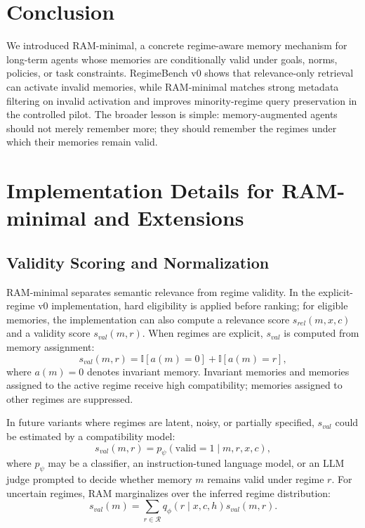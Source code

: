 \documentclass{article} %
\begin{document}
\section{Conclusion}
\label{sec:conclusion}

We introduced RAM-minimal, a concrete regime-aware memory mechanism for long-term agents whose memories are conditionally valid under goals, norms, policies, or task constraints.
RegimeBench v0 shows that relevance-only retrieval can activate invalid memories, while RAM-minimal matches strong metadata filtering on invalid activation and improves minority-regime query preservation in the controlled pilot.
The broader lesson is simple: memory-augmented agents should not merely remember more; they should remember the regimes under which their memories remain valid.





\appendix
\section{Implementation Details for RAM-minimal and Extensions}
\label{app:implementation_details}

\subsection{Validity Scoring and Normalization}
\label{app:validity_scoring}

RAM-minimal separates semantic relevance from regime validity.
In the explicit-regime v0 implementation, hard eligibility is applied before ranking; for eligible memories, the implementation can also compute a relevance score $s_{rel}(m,x,c)$ and a validity score $s_{val}(m,r)$.
When regimes are explicit, $s_{val}$ is computed from memory assignment:
\begin{equation}
    s_{val}(m,r)
    =
    \mathbb{I}[a(m)=0]
    +
    \mathbb{I}[a(m)=r],
\end{equation}
where $a(m)=0$ denotes invariant memory.
Invariant memories and memories assigned to the active regime receive high compatibility; memories assigned to other regimes are suppressed.

In future variants where regimes are latent, noisy, or partially specified, $s_{val}$ could be estimated by a compatibility model:
\begin{equation}
    s_{val}(m,r) = p_\psi(\mathrm{valid}=1 \mid m,r,x,c),
\end{equation}
where $p_\psi$ may be a classifier, an instruction-tuned language model, or an LLM judge prompted to decide whether memory $m$ remains valid under regime $r$.
For uncertain regimes, RAM marginalizes over the inferred regime distribution:
\begin{equation}
    s_{val}(m)
    =
    \sum_{r \in \mathcal{R}}
    q_\phi(r \mid x,c,h) s_{val}(m,r).
\end{equation}
\end{document}
